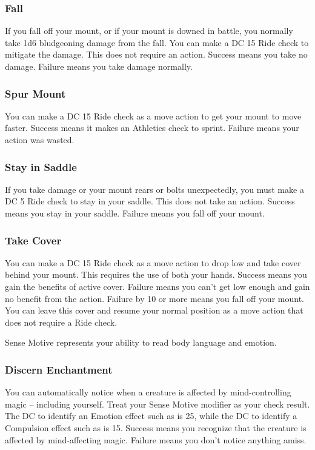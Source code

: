 \subsubsection{Fall}
If you fall off your mount, or if your mount is downed in battle, you normally take 1d6 bludgeoning damage from the fall. You can make a DC 15 Ride check to mitigate the damage. This does not require an action. Success means you take no damage. Failure means you take damage normally. 

\subsubsection{Spur Mount}
You can make a DC 15 Ride check as a move action to get your mount to move faster. Success means it makes an Athletics check to sprint. Failure means your action was wasted. 

\subsubsection{Stay in Saddle}
If you take damage or your mount rears or bolts unexpectedly, you must make a DC 5 Ride check to stay in your saddle. This does not take an action. Success means you stay in your saddle. Failure means you fall off your mount.

\subsubsection{Take Cover}
You can make a DC 15 Ride check as a move action to drop low and take cover behind your mount. This requires the use of both your hands. Success means you gain the benefits of active cover. Failure means you can't get low enough and gain no benefit from the action. Failure by 10 or more means you fall off your mount. You can leave this cover and resume your normal position as a move action that does not require a Ride check.

Sense Motive represents your ability to read body language and emotion.

\subsubsection{Discern Enchantment}
You can automatically notice when a creature is affected by mind-controlling magic -- including yourself. Treat your Sense Motive modifier as your check result. The DC to identify an Emotion effect such as  is 25, while the DC to identify a Compulsion effect such as  is 15. Success means you recognize that the creature is affected by mind-affecting magic. Failure means you don't notice anything amiss.

